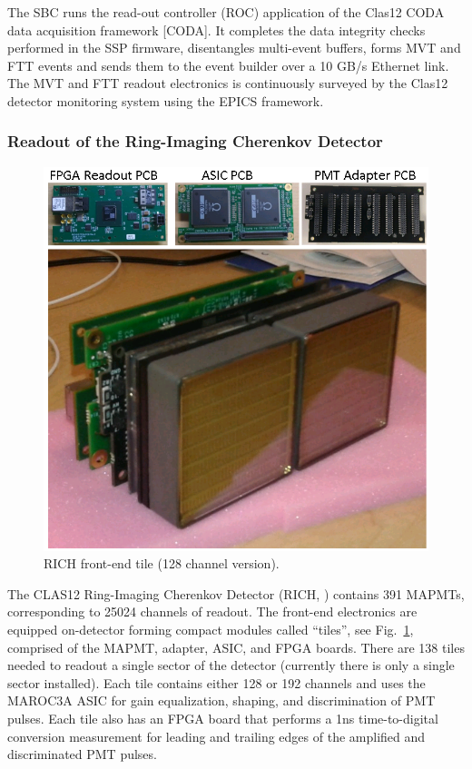 The SBC runs the read-out controller (ROC) application of the Clas12 CODA data acquisition framework [CODA]. It completes the data integrity checks performed in the SSP firmware, disentangles multi-event buffers, forms MVT and FTT events and sends them to the event builder over a 10 GB/s Ethernet link. The MVT and FTT readout electronics is continuously surveyed by the Clas12 detector monitoring system using the EPICS framework.

\subsubsection{Readout of the Ring-Imaging Cherenkov Detector}

\begin{figure}[hbt]
	\centering
	\includegraphics[width=1.0\columnwidth,keepaspectratio]{img/rich_tile_128ch.png}
	\caption{RICH front-end tile (128 channel version).}
	\label{fig:rich1}
\end{figure}

The CLAS12 Ring-Imaging Cherenkov Detector (RICH, \cite{rich-ref}) contains 391 MAPMTs, corresponding to 25024 channels of readout. The front-end electronics are equipped on-detector forming compact modules called ``tiles'', see Fig.~\ref{fig:rich1}, comprised of the MAPMT, adapter, ASIC, and FPGA boards. There are 138 tiles needed to readout a single sector of the detector (currently there is only a single sector installed). Each tile contains either 128 or 192 channels and uses the MAROC3A ASIC for gain equalization, shaping, and discrimination of PMT pulses. Each tile also has an FPGA board that performs a 1ns time-to-digital conversion measurement for leading and trailing edges of the amplified and discriminated PMT pulses.

